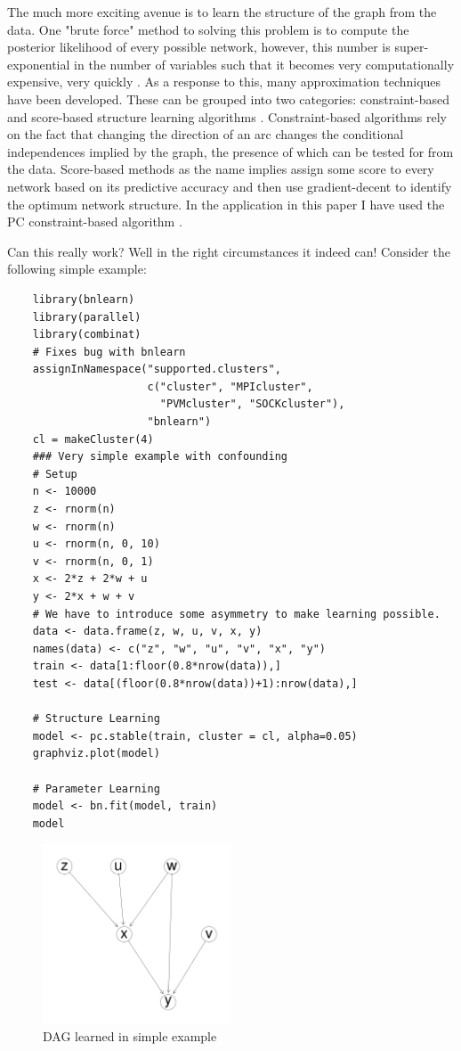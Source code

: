 \documentclass{article}
\begin{document}
The much more exciting avenue is to learn the structure of the graph from the data. One "brute force" method to solving this problem is to compute the posterior likelihood of every possible network, however, this number is super-exponential in the number of variables such that it becomes very computationally expensive, very quickly \cite{chickering1996learning}. As a response to this, many approximation techniques have been developed. These can be grouped into two categories: constraint-based and score-based structure learning algorithms \cite{spirtes1991algorithm} \cite{verma1991equivalence}. Constraint-based algorithms rely on the fact that changing the direction of an arc changes the conditional independences implied by the graph, the presence of which can be tested for from the data. Score-based methods as the name implies assign some score to every network based on its predictive accuracy and then use gradient-decent to identify the optimum network structure. In the application in this paper I have used the PC constraint-based algorithm \cite{spirtes2000causation} \cite{le2015parallelpc}.

Can this really work? Well in the right circumstances it indeed can! Consider the following simple example:

\begin{verbatim}
    library(bnlearn)
    library(parallel)
    library(combinat)
    # Fixes bug with bnlearn
    assignInNamespace("supported.clusters", 
                      c("cluster", "MPIcluster",  
                        "PVMcluster", "SOCKcluster"), 
                      "bnlearn")
    cl = makeCluster(4)
    ### Very simple example with confounding
    # Setup
    n <- 10000
    z <- rnorm(n)
    w <- rnorm(n)
    u <- rnorm(n, 0, 10)
    v <- rnorm(n, 0, 1)
    x <- 2*z + 2*w + u
    y <- 2*x + w + v
    # We have to introduce some asymmetry to make learning possible.
    data <- data.frame(z, w, u, v, x, y)
    names(data) <- c("z", "w", "u", "v", "x", "y")
    train <- data[1:floor(0.8*nrow(data)),]
    test <- data[(floor(0.8*nrow(data))+1):nrow(data),]
    
    # Structure Learning
    model <- pc.stable(train, cluster = cl, alpha=0.05)
    graphviz.plot(model)

    # Parameter Learning
    model <- bn.fit(model, train)
    model
\end{verbatim}

\begin{figure}
\centering
\label{dag4}
\includegraphics[width=0.5\textwidth]{simple_example.png}
\caption{DAG learned in simple example}
\end{figure}
\end{document}
